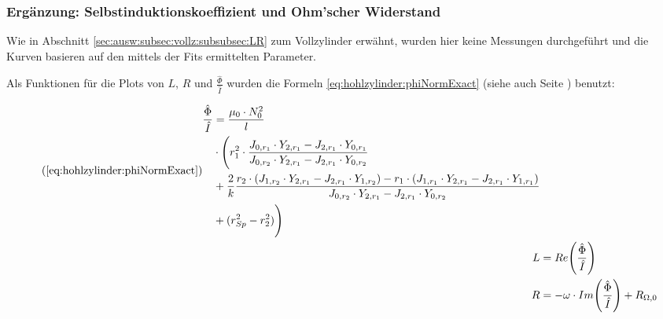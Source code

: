 %        
\clearpage
\subsubsection{Erg\"anzung: Selbstinduktionskoeffizient und Ohm'scher Widerstand}
\label{sec:ausw:subsec:hohlz:cu:subsubsec:LR}

Wie  in  Abschnitt \ref{sec:ausw:subsec:vollz:subsubsec:LR}  zum  Vollzylinder
erw\"ahnt, wurden hier keine Messungen  durchgef\"uhrt und die Kurven basieren
auf den mittels der Fits ermittelten Parameter.

Als Funktionen f\"ur  die Plots von $L$,  $R$ und $\frac{\hat{\Phi}}{\hat{I}}$
wurden  die  Formeln   \ref{eq:hohlzylinder:phiNormExact}  (siehe  auch  Seite
\pageref{eq:hohlzylinder:phiNormExact}) benutzt:

\begin{align*}
    \tag{\ref{eq:hohlzylinder:phiNormExact}}
    \begin{split}
    \frac{\hat{\Phi}}{\hat{I}} & = \frac{\mu_0 \cdot N_0^2}{l} \\
                               & \cdot \Biggl( r_1^2 \cdot \frac{J_{0,r_1} \cdot Y_{2,r_1} - J_{2,r_1} \cdot Y_{0,r_1}}{J_{0,r_2} \cdot Y_{2,r_1} - J_{2,r_1} \cdot Y_{0,r_2}} \\
                               & + \frac{2}{k} \frac{r_2 \cdot (J_{1,r_2} \cdot Y_{2,r_1} - J_{2,r_1} \cdot Y_{1,r_2}) - r_1 \cdot (J_{1,r_1} \cdot Y_{2,r_1} - J_{2,r_1} \cdot Y_{1,r_1})}{J_{0,r_2} \cdot Y_{2,r_1} - J_{2,r_1} \cdot Y_{0,r_2}} \\
                               & + (r_{Sp}^2 - r_2^2) \Biggr)
    \end{split} \\
    L & = Re \Biggl(\frac{\hat{\Phi}}{\hat{I}} \Biggr) \\
    R & = - \omega \cdot Im \Biggl(\frac{\hat{\Phi}}{\hat{I}} \Biggr) + R_{\Omega,0}
\end{align*}

